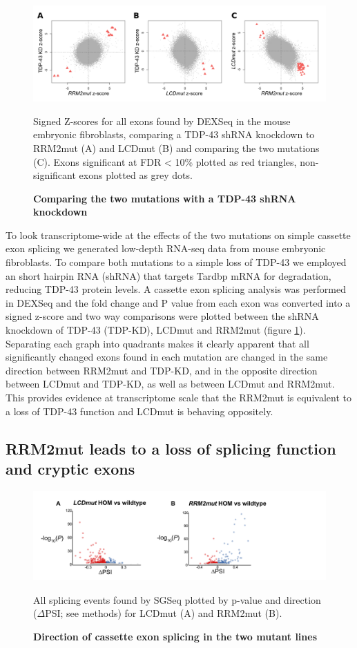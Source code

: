 \begin{figure}[h!]
	\centering
	\includegraphics[width=14cm]{Figures/05_tdp_mice/mef_scatters.png}
	\caption{\textbf{Comparing the two mutations with a TDP-43 shRNA knockdown}}
	Signed Z-scores for all exons found by DEXSeq in the mouse embryonic fibroblasts, comparing a TDP-43 shRNA knockdown to RRM2mut (A) and LCDmut (B) and comparing the two mutations (C). Exons significant at FDR < 10\% plotted as red triangles, non-significant exons plotted as grey dots.
	\label{fig:mef_scatters}
\end{figure}

To look transcriptome-wide at the effects of the two mutations on simple cassette exon splicing we generated low-depth RNA-seq data from mouse embryonic fibroblasts. To compare both mutations to a simple loss of TDP-43 we employed an short hairpin RNA (shRNA) that targets Tardbp mRNA for degradation, reducing TDP-43 protein levels. A cassette exon splicing analysis was performed in DEXSeq and the fold change and P value from each exon was converted into a signed z-score and two way comparisons were plotted between the shRNA knockdown of TDP-43 (TDP-KD), LCDmut and RRM2mut (figure \ref{fig:mef_scatters}). Separating each graph into quadrants makes it clearly apparent that all significantly changed exons found in each mutation are changed in the same direction between RRM2mut and TDP-KD, and in the opposite direction between LCDmut and TDP-KD, as well as between LCDmut and RRM2mut. This provides evidence at transcriptome scale that the RRM2mut is equivalent to a loss of TDP-43 function and LCDmut is behaving oppositely.

\subsection{RRM2mut leads to a loss of splicing function and cryptic exons}

\begin{figure}[h!]
	\centering
	\includegraphics[width=18cm]{Figures/05_tdp_mice/transcriptome_scatters.png}
	\caption{\textbf{Direction of cassette exon splicing in the two mutant lines}}
	All splicing events found by SGSeq plotted by p-value and direction ($\Delta$PSI; see methods) for LCDmut (A) and RRM2mut (B).
	\label{fig:cassette_scatters}
\end{figure}

